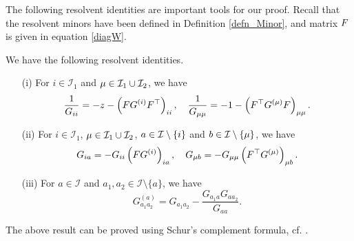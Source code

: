 The following resolvent identities are important tools for our proof. Recall that the resolvent minors have been defined in Definition \ref{defn_Minor}, and matrix $\AF$ is given in equation \eqref{diagW}.
\begin{lemma}\label{lemm_resolvent}
We have the following resolvent identities.
\begin{itemize}
	\item[(i)] For $i\in \mathcal I_1$ and $\mu\in \mathcal I_1\cup \cal I_2$, we have
		\begin{equation}
			\frac{1}{G_{ii}} =  - z - \left( {\AF G^{\left( i \right)} \AF^\top} \right)_{ii} ,\quad  \frac{1}{{G_{\mu \mu } }} =  - 1  - \left( {\AF^\top  G^{\left( \mu  \right)} \AF} \right)_{\mu \mu }.\label{resolvent2}
		\end{equation}
	\item[(ii)] For $i\in \mathcal I_1$, $\mu \in \mathcal I_1\cup \cal I_2$, $a\in \cal I\setminus \{i\}$ and $b\in \cal I\setminus \{ \mu\}$, we have
		\begin{equation}
			G_{ia}   = -G_{ii}  \left( \AF G^{\left( {i} \right)} \right)_{ia},\quad  G_{\mu b }  = - G_{\mu \mu }  \left( \AF^\top  G^{\left( {\mu } \right)}  \right)_{\mu b }. \label{resolvent3}
		\end{equation}
 \item[(iii)] For $a \in \mathcal I$ and $a_1,a_2 \in \mathcal I \setminus \{a\}$, we have
		\begin{equation}
			G_{a_1a_2}^{\left( a \right)}  = G_{a_1a_2}  - \frac{G_{a_1a} G_{aa_2}}{G_{aa}}.
			\label{resolvent8}
		\end{equation}
\end{itemize}
\end{lemma}
The above result can be proved using Schur's complement formula, cf. \citet[Lemma 4.4]{Anisotropic}.

